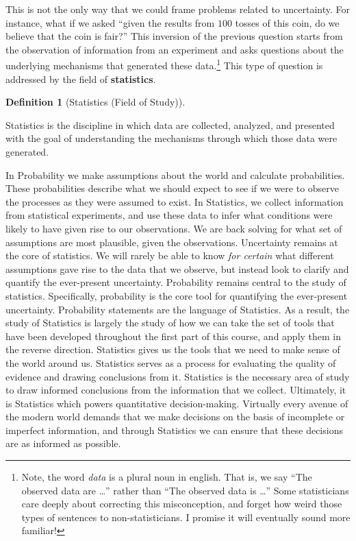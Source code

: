 \documentclass[
  letterpaper,
  DIV=11,
  numbers=noendperiod]{scrreprt}
\theoremstyle{definition}
\theoremstyle{definition}
\theoremstyle{definition}
\newtheorem{definition}{Definition}[chapter]
\theoremstyle{remark}
\begin{document}
This is not the only way that we could frame problems related to
uncertainty. For instance, what if we asked ``given the results from
\(100\) tosses of this coin, do we believe that the coin is fair?'' This
inversion of the previous question starts from the observation of
information from an experiment and asks questions about the underlying
mechanisms that generated these data.\footnote{Note, the word
  \emph{data} is a plural noun in english. That is, we say ``The
  observed data are \ldots{}'' rather than ``The observed data is
  \ldots{}'' Some statisticians care deeply about correcting this
  misconception, and forget how weird those types of sentences to
  non-statisticians. I promise it will eventually sound more familiar!}
This type of question is addressed by the field of \textbf{statistics}.

\begin{definition}[Statistics (Field of
Study)]\protect\hypertarget{def-statistics}{}\label{def-statistics}

Statistics is the discipline in which data are collected, analyzed, and
presented with the goal of understanding the mechanisms through which
those data were generated.

\end{definition}

In Probability we make assumptions about the world and calculate
probabilities. These probabilities describe what we should expect to see
if we were to observe the processes as they were assumed to exist. In
Statistics, we collect information from statistical experiments, and use
these data to infer what conditions were likely to have given rise to
our observations. We are back solving for what set of assumptions are
most plausible, given the observations. Uncertainty remains at the core
of statistics. We will rarely be able to know \emph{for certain} what
different assumptions gave rise to the data that we observe, but instead
look to clarify and quantify the ever-present uncertainty. Probability
remains central to the study of statistics. Specifically, probability is
the core tool for quantifying the ever-present uncertainty. Probability
statements are the language of Statistics. As a result, the study of
Statistics is largely the study of how we can take the set of tools that
have been developed throughout the first part of this course, and apply
them in the reverse direction. Statistics gives us the tools that we
need to make sense of the world around us. Statistics serves as a
process for evaluating the quality of evidence and drawing conclusions
from it. Statistics is the necessary area of study to draw informed
conclusions from the information that we collect. Ultimately, it is
Statistics which powers quantitative decision-making. Virtually every
avenue of the modern world demands that we make decisions on the basis
of incomplete or imperfect information, and through Statistics we can
ensure that these decisions are as informed as possible.
\end{document}
